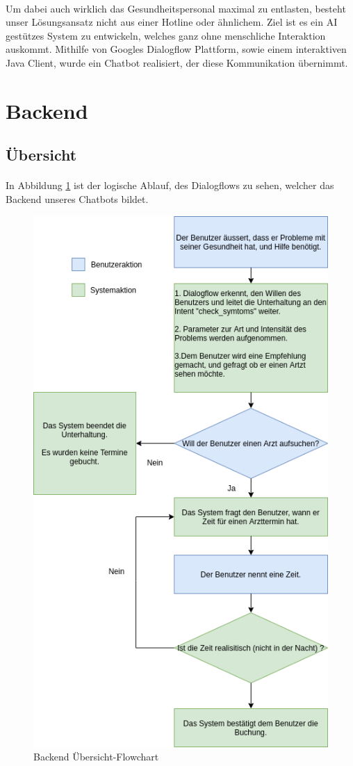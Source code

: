\documentclass[11pt,a4paper]{article}
\begin{document}
        \paragraph{}
            Um dabei auch wirklich das Gesundheitspersonal maximal zu entlasten, besteht unser
            Lösungsansatz nicht aus einer Hotline oder ähnlichem. Ziel ist es ein AI gestützes System zu
            entwickeln, welches ganz ohne menschliche Interaktion auskommt. Mithilfe von
            Googles Dialogflow Plattform, sowie einem interaktiven Java Client, wurde ein Chatbot
            realisiert, der diese Kommunikation übernimmt.


\newpage


\section{Backend}
    \subsection{Übersicht}
        \paragraph{}
        In Abbildung \ref{fig:backEndFlowChart} ist der logische Ablauf, des Dialogflows zu sehen, welcher das
        Backend unseres Chatbots bildet.
        \begin{figure}[h!]
            \begin{center}
                \includegraphics[width=0.65\linewidth]{backendOverview.png}
                \caption{Backend Übersicht-Flowchart}
                \label{fig:backEndFlowChart}
            \end{center}
        \end{figure}
\end{document}
